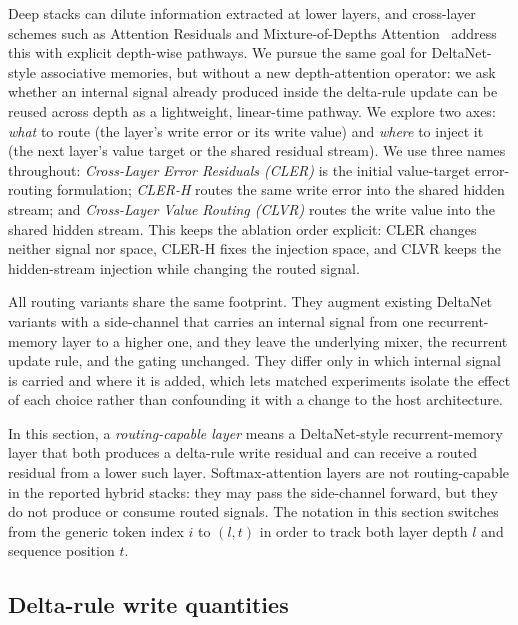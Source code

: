 \documentclass{article}
\begin{document}
Deep stacks can dilute information extracted at lower layers, and cross-layer schemes such as Attention Residuals and Mixture-of-Depths Attention~\cite{attention_residuals,mixture_of_depths_attention} address this with explicit depth-wise pathways. We pursue the same goal for DeltaNet-style associative memories, but without a new depth-attention operator: we ask whether an internal signal already produced inside the delta-rule update can be reused across depth as a lightweight, linear-time pathway. We explore two axes: \emph{what} to route (the layer's write error or its write value) and \emph{where} to inject it (the next layer's value target or the shared residual stream). We use three names throughout: \emph{Cross-Layer Error Residuals (CLER)} is the initial value-target error-routing formulation; \emph{CLER-H} routes the same write error into the shared hidden stream; and \emph{Cross-Layer Value Routing (CLVR)} routes the write value into the shared hidden stream. This keeps the ablation order explicit: CLER changes neither signal nor space, CLER-H fixes the injection space, and CLVR keeps the hidden-stream injection while changing the routed signal.

All routing variants share the same footprint. They augment existing DeltaNet variants with a side-channel that carries an internal signal from one recurrent-memory layer to a higher one, and they leave the underlying mixer, the recurrent update rule, and the gating unchanged. They differ only in which internal signal is carried and where it is added, which lets matched experiments isolate the effect of each choice rather than confounding it with a change to the host architecture.

In this section, a \emph{routing-capable layer} means a DeltaNet-style recurrent-memory layer that both produces a delta-rule write residual and can receive a routed residual from a lower such layer. Softmax-attention layers are not routing-capable in the reported hybrid stacks: they may pass the side-channel forward, but they do not produce or consume routed signals. The notation in this section switches from the generic token index $i$ to $(l,t)$ in order to track both layer depth $l$ and sequence position $t$.

\subsection{Delta-rule write quantities}
\end{document}
